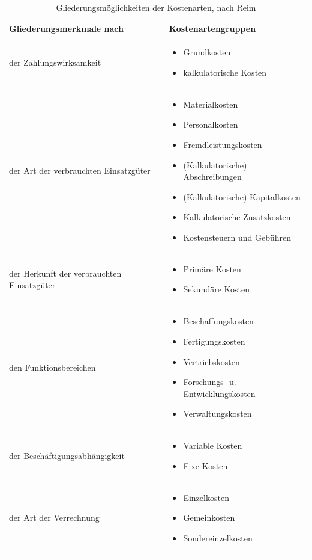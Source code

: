 \begin{table}[h!]
\begin{tabularx}{\textwidth}{|X|X|}
	\hline \textbf{Gliederungsmerkmale nach}  &  \textbf{Kostenartengruppen}\\ 
	\hline der Zahlungswirksamkeit  & \begin{itemize}
		\item Grundkosten
		\item kalkulatorische Kosten
	\end{itemize} \\ 
	\hline der Art der verbrauchten Einsatzgüter & \begin{itemize}
		\item Materialkosten
		\item Personalkosten
		\item Fremdleistungskosten
		\item (Kalkulatorische) Abschreibungen
		\item (Kalkulatorische) Kapitalkosten
		\item Kalkulatorische Zusatzkosten
		\item Kostensteuern und Gebühren
	\end{itemize} \\ 
	\hline der Herkunft der verbrauchten Einsatzgüter & \begin{itemize}
		\item Primäre Kosten
		\item Sekundäre Kosten	
	\end{itemize}  \\ 
	\hline den Funktionsbereichen &\begin{itemize}
		\item Beschaffungskosten
		\item Fertigungskosten
		\item Vertriebskosten
		\item Forschungs- u. Entwicklungskosten
		\item Verwaltungskosten
	\end{itemize} \\ 
	\hline der Beschäftigungsabhängigkeit & \begin{itemize}
		\item Variable Kosten
		\item Fixe Kosten
	\end{itemize} \\ 
	\hline der Art der Verrechnung & \begin{itemize}
		\item Einzelkosten
		\item Gemeinkosten
		\item Sondereinzelkosten
	\end{itemize} \\ 
	\hline 
\end{tabularx}
	\caption{Gliederungsmöglichkeiten der Kostenarten, nach Reim}
	\label{tab_gliederung_kostenarten}
\end{table}










